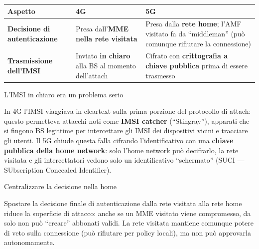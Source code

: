 \documentclass[
  italian,
  openany]{book}
\newcounter{none} %
\begin{document}
{\def\LTcaptype{none} %
\begin{longtable}[]{@{}
  >{\raggedright\arraybackslash}p{}
  >{\raggedright\arraybackslash}p{}
  >{\raggedright\arraybackslash}p{}@{}}
\toprule\noalign{}
\begin{minipage}[b]{\linewidth}\raggedright
Aspetto
\end{minipage} & \begin{minipage}[b]{\linewidth}\raggedright
4G
\end{minipage} & \begin{minipage}[b]{\linewidth}\raggedright
5G
\end{minipage} \\
\midrule\noalign{}
\endhead
\bottomrule\noalign{}
\endlastfoot
\textbf{Decisione di autenticazione} & Presa dall'\textbf{MME nella rete
visitata} & Presa dalla \textbf{rete home}; l'AMF visitato fa da
``middleman'' (può comunque rifiutare la connessione) \\
\textbf{Trasmissione dell'IMSI} & Inviato \textbf{in chiaro} alla BS al
momento dell'attach & Cifrato con \textbf{crittografia a chiave
pubblica} prima di essere trasmesso \\
\end{longtable}
}

\begin{calloutwarning}{L’IMSI in chiaro era un problema serio}

In 4G l'IMSI viaggiava in cleartext sulla prima porzione del protocollo
di attach: questo permetteva attacchi noti come \textbf{IMSI catcher}
(``Stingray''), apparati che si fingono BS legittime per intercettare
gli IMSI dei dispositivi vicini e tracciare gli utenti. Il 5G chiude
questa falla cifrando l'identificativo con una \textbf{chiave pubblica
della home network}: solo l'home network può decifrarlo, la rete
visitata e gli intercettatori vedono solo un identificativo
``schermato'' (SUCI --- SUbscription Concealed Identifier).

\end{calloutwarning}

\begin{calloutnote}{Centralizzare la decisione nella home}

Spostare la decisione finale di autenticazione dalla rete visitata alla
rete home riduce la superficie di attacco: anche se un MME visitato
viene compromesso, da solo non può ``creare'' abbonati validi. La rete
visitata mantiene comunque potere di veto sulla connessione (può
rifiutare per policy locali), ma non può approvarla autonomamente.

\end{calloutnote}
\end{document}
